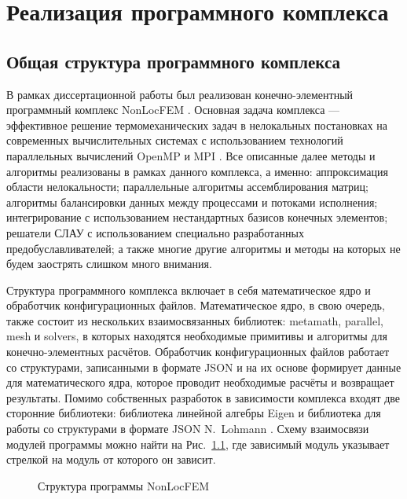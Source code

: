 \chapter{Реализация программного комплекса}\label{ch:ProgramComplex}

\section{Общая структура программного комплекса}\label{sec:ProgramComplex/GeneralStructure}

В рамках диссертационной работы был реализован конечно-элементный программный комплекс NonLocFEM \cite{NonLocFEM}. Основная задача комплекса --- эффективное решение термомеханических задач в нелокальных постановках на современных вычислительных системах с использованием технологий параллельных вычислений OpenMP \cite{OpenMP} и MPI \cite{MPI}. Все описанные далее методы и алгоритмы реализованы в рамках данного комплекса, а именно: аппроксимация области нелокальности; параллельные алгоритмы ассемблирования матриц; алгоритмы балансировки данных между процессами и потоками исполнения; интегрирование с использованием нестандартных базисов конечных элементов; решатели СЛАУ с использованием специально разработанных предобуславливателей; а также многие другие алгоритмы и методы на которых не будем заострять слишком много внимания.

Структура программного комплекса включает в себя математическое ядро и обработчик конфигурационных файлов. Математическое ядро, в свою очередь, также состоит из нескольких взаимосвязанных библиотек: metamath, parallel, mesh и solvers, в которых находятся необходимые примитивы и алгоритмы для конечно-элементных расчётов. Обработчик конфигурационных файлов работает со структурами, записанными в формате JSON \cite{JSONShema} и на их основе формирует данные для математического ядра, которое проводит необходимые расчёты и возвращает результаты. Помимо собственных разработок в зависимости комплекса входят две сторонние библиотеки: библиотека линейной алгебры Eigen \cite{EigenLib} и библиотека для работы со структурами в формате JSON N.~Lohmann \cite{NlohmannJson}. Схему взаимосвязи модулей программы можно найти на Рис.~\ref{pic:NonLocFEMSchema}, где зависимый модуль указывает стрелкой на модуль от которого он зависит.

\begin{figure}[ht]
    \caption{Структура программы NonLocFEM}\label{pic:NonLocFEMSchema}
\end{figure}

